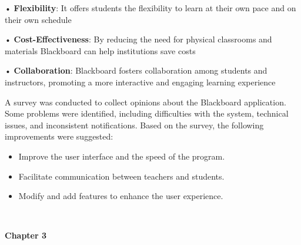 \documentclass[12pt]{article}
\begin{document}
	•\textbf{	Flexibility}: It offers students the flexibility to learn at their own pace and on their own schedule 
	
	•\textbf{	Cost-Effectiveness}: By reducing the need for physical classrooms and materials Blackboard can help institutions save costs
	
	•	\textbf{Collaboration}: Blackboard fosters collaboration among students and instructors, promoting a more interactive and engaging learning experience 

	A survey was conducted to collect opinions about the Blackboard application. Some problems were identified, including difficulties with the system, technical issues, and inconsistent notifications. Based on the survey, the following improvements were suggested:
	\begin{itemize}
		\item Improve the user interface and the speed of the program.
		\item Facilitate communication between teachers and students.
		\item Modify and add features to enhance the user experience.
	\end{itemize}
	
	\	\begin{titlepage}		
	\centering
	\vspace*{1cm}
	\vfill
	
	\textbf{\Huge{Chapter 3}} \\
	
	
	\vfill
	
	\large
	\end{titlepage}
	
\end{document}
